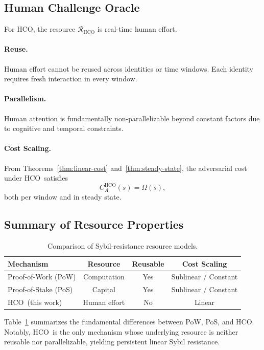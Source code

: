\documentclass[11pt]{article}
\newcommand{\HCO}{HCO\xspace}
\begin{document}
\subsection{Human Challenge Oracle}
\label{subsec:hco-resource}

For \HCO, the resource $\mathcal{R}_{\mathrm{HCO}}$ is real-time human effort.

\paragraph{Reuse.}
Human effort cannot be reused across identities or time windows. Each identity
requires fresh interaction in every window.

\paragraph{Parallelism.}
Human attention is fundamentally non-parallelizable beyond constant factors due
to cognitive and temporal constraints.

\paragraph{Cost Scaling.}
From Theorems~\ref{thm:linear-cost} and~\ref{thm:steady-state}, the adversarial cost
under \HCO\ satisfies
\[
C_A^{\mathrm{HCO}}(s) = \Omega(s),
\]
both per window and in steady state.

\subsection{Summary of Resource Properties}
\label{subsec:resource-summary}

\begin{table}[t]
	\centering
	\caption{Comparison of Sybil-resistance resource models.}
	\label{tab:resource-comparison}
	\begin{tabular}{lccc}
		\toprule
		Mechanism & Resource & Reusable & Cost Scaling \\
		\midrule
		Proof-of-Work (PoW) & Computation & Yes & Sublinear / Constant \\
		Proof-of-Stake (PoS) & Capital & Yes & Sublinear / Constant \\
		\HCO\ (this work) & Human effort & No & Linear \\
		\bottomrule
	\end{tabular}
\end{table}

Table~\ref{tab:resource-comparison} summarizes the fundamental differences between
PoW, PoS, and \HCO. Notably, \HCO\ is the only mechanism whose underlying resource
is neither reusable nor parallelizable, yielding persistent linear Sybil resistance.
\end{document}
